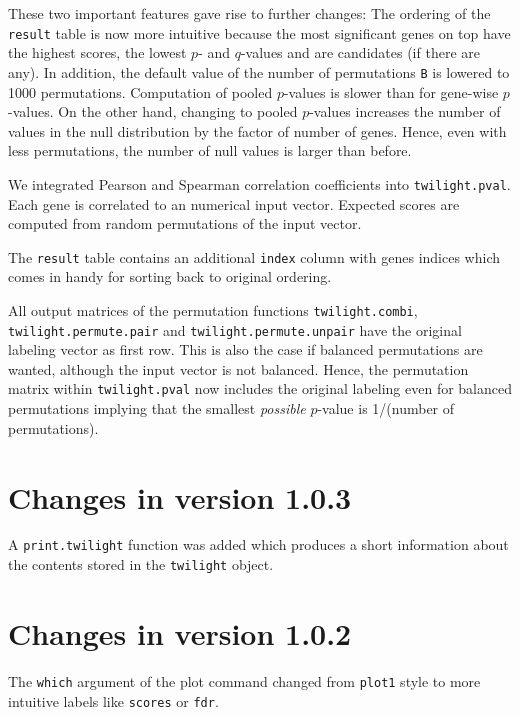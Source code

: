 \documentclass[11pt,a4paper,fleqn]{report}
\newcommand{\Robject}[1]{{\texttt{#1}}}
\newcommand{\Rfunction}[1]{{\texttt{#1}}}
\newcommand{\Rfunarg}[1]{{\texttt{#1}}}
\begin{document}
These two important features gave rise to further changes: The ordering of the \Robject{result} table is now more intuitive because the most significant genes on top have the highest scores, the lowest $p$- and $q$-values and are candidates (if there are any). In addition, the default value of the number of permutations \Rfunarg{B} is lowered to 1000 permutations. Computation of pooled $p$-values is slower than for gene-wise $p$-values. On the other hand, changing to pooled $p$-values increases the number of values in the null distribution by the factor of number of genes. Hence, even with less permutations, the number of null values is larger than before.

We integrated Pearson and Spearman correlation coefficients into \Rfunction{twilight.pval}. Each gene is correlated to an numerical input vector. Expected scores are computed from random permutations of the input vector.
       
The \Robject{result} table contains an additional \Robject{index} column with genes indices which comes in handy for sorting back to original ordering.

All output matrices of the permutation functions \Rfunction{twilight.combi}, \Rfunction{twilight.permute.pair} and \Rfunction{twilight.permute.unpair} have the original labeling vector as first row. This is also the case if balanced permutations are wanted, although the input vector is not balanced. Hence, the permutation matrix within \Rfunction{twilight.pval} now includes the original labeling even for balanced permutations implying that the smallest \textit{possible} $p$-value is 1/(number of permutations).


\section{Changes in version 1.0.3}

A \Rfunction{print.twilight} function was added which produces a short information about the contents stored in the \Robject{twilight} object.


\section{Changes in version 1.0.2}

The \Rfunarg{which} argument of the plot command changed from \Rfunction{plot1} style to more intuitive labels like \Rfunarg{scores} or \Rfunarg{fdr}.

       
\end{document}
